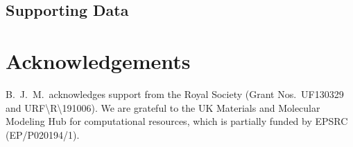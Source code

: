 \documentclass[aps,prmaterials,twocolumn,superscriptaddress,reprint,citeautoscript]{revtex4-2}
\begin{document}
\subsection{Supporting Data}

\section{Acknowledgements}
B.\ J.\ M.\ acknowledges support from the Royal Society (Grant Nos.\ UF130329 and URF\textbackslash R\textbackslash 191006).
We are grateful to the UK Materials and Molecular Modeling Hub for computational resources, which is partially funded by EPSRC (EP/P020194/1).


\end{document}
